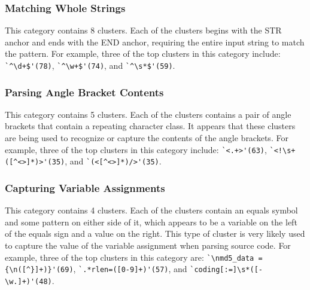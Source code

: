 \subsubsection{ Matching Whole Strings}
This category contains 8 clusters. Each of the clusters begins with the STR anchor and ends with the END anchor, requiring the entire input string to match the pattern. For example, three of the top clusters in this category include:
\verb!`^\d+$'(78)!, \verb!`^\w+$'(74)!, and \verb!`^\s*$'(59)!.


\subsubsection{Parsing Angle Bracket Contents}
This category contains 5 clusters. Each of the clusters contains a pair of angle brackets that contain a repeating character class.  It appears that these clusters are being used to recognize or capture the contents of the angle brackets.  For example, three of the top clusters in this category include:
\verb!`<.+>'(63)!, \verb?`<!\s+([^<>]*)>'(35)?, and \verb!`(<[^<>]*)/>'(35)!. %

\subsubsection{Capturing Variable Assignments}
This category contains 4 clusters. Each of the clusters contain an equals symbol and some pattern on either side of it, which appears to be a variable on the left of the equals sign and a value on the right.  This type of cluster is very likely used to capture the value of the variable assignment when parsing source code. For example, three of the top clusters in this category are:
\verb!`\nmd5_data = {\n([^}]+)}'(69)!, \verb!`.*rlen=([0-9]+)'(57)!, and \verb!`coding[:=]\s*([-\w.]+)'(48)!.


